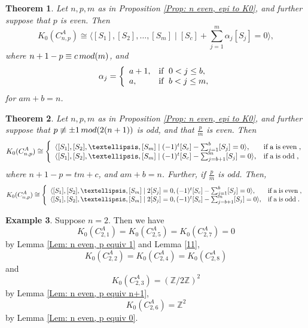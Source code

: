 \documentclass[a4paper,reqno,11pt]{amsart}
\newtheorem{theorem}{Theorem}[section]
\theoremstyle{definition}
\newtheorem{example}[theorem]{Example}
\def \text{\mbox}
\renewcommand{\mod}{\mathop{\rm mod}\nolimits}%
\begin{document}
\begin{theorem}\label{Thm: n even, p even}
	Let $n,p,m$ as in Proposition \ref{Prop: n even, epi to K0}, and further suppose that $p$ is even.
	Then
	\[
	K_0(C_{n,p}^A) \cong \langle [S_1], [S_2], \ldots, [S_m] \mid [S_c] + \sum_{j=1}^{m} \alpha_j [S_j] = 0 \rangle,
	\]
	where $n+1 - p \equiv c \mod (m)$, and
\[ \alpha_j =\left\{
\begin{array}{ll}
a+1, & \text{if \;} 0<j \leq b,\\
		a, & \text{if \;} b < j \leq m,
\end{array}
\right.
\]	
for $am+b=n$.	
\end{theorem}

\begin{theorem}\label{Thm: n even,  p odd}
	Let $n,p,m$ as in Proposition \ref{Prop: n even, epi to K0}, and further suppose that $p \not\equiv \pm 1 \mod (2(n+1))$ is odd, and that $\frac{p}{m}$ is even.
	Then
\[ K_0(C_{n,p}^A) \cong\left\{
\begin{array}{ll}
\langle [S_1], [S_2], \ldots, [S_m] \mid (-1)^t [S_c] - \sum_{j=1}^{b} [S_j] = 0 \rangle, & \text{if\;}$a$\text{\;is\;even\;},\\
		\langle [S_1], [S_2], \ldots, [S_m] \mid (-1)^t [S_c] - \sum_{j=b+1}^{m} [S_j] = 0 \rangle, & \text{if\;}$a$\text{\;is\;odd\;},
\end{array}
\right.
\]	
	where $n+1 -p = tm +c$, and $am+b=n$.
	Further, if $\frac{p}{m}$ is odd.
	Then,
\[ K_0(C_{n,p}^A) \cong\left\{
\begin{array}{ll}
\langle [S_1], [S_2], \ldots, [S_m] \mid 2[S_j] = 0, (-1)^t [S_c] - \sum_{j=1}^{b} [S_j] = 0\rangle, & \text{if\;}$a$\text{\;is\;even\;},\\
		\langle [S_1], [S_2], \ldots, [S_m] \mid 2[S_j] = 0, (-1)^t [S_c] - \sum_{j=b+1}^{m} [S_j] = 0 \rangle, & \text{if\;}$a$\text{\;is\;odd\;}.
\end{array}
\right.
\]	
\end{theorem}
\begin{example}
Suppose $n=2$. Then we have
$$K_0(C_{2,1}^A)=K_0(C_{2,5}^A)=K_0(C_{2,7}^A)=0$$
by Lemma \ref{Lem: n even, p equiv 1} and Lemma \ref{11},
$$K_0(C_{2,2}^A)=K_0(C_{2,4}^A)=K_0(C_{2,8}^A)$$
and
$$K_0(C_{2,3}^A)=(\mathbb{Z}/2\mathbb{Z})^2$$
by Lemma \ref{Lem: n even, p equiv n+1},
$$K_0(C_{2,6}^A)=\mathbb{Z}^2 $$
by Lemma \ref{Lem: n even, p equiv 0}.
\end{example}
\end{document}
